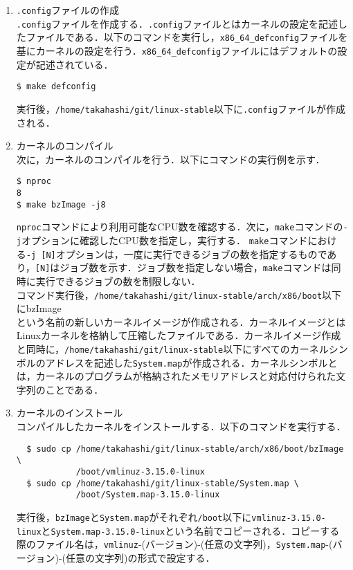 \documentclass[12pt]{jsarticle}
\begin{document}
\begin{enumerate}
\item \verb|.config|ファイルの作成 \\
\verb|.config|ファイルを作成する．\verb|.config|ファイルとはカーネルの設定を記述したファイルである．以下のコマンドを実行し，\verb|x86_64_defconfig|ファイルを基にカーネルの設定を行う．\verb|x86_64_defconfig|ファイルにはデフォルトの設定が記述されている．

\begin{verbatim}
$ make defconfig
\end{verbatim}
実行後，\verb|/home/takahashi/git/linux-stable|以下に\verb|.config|ファイルが作成される．

\item カーネルのコンパイル \\
次に，カーネルのコンパイルを行う．以下にコマンドの実行例を示す．

\newpage
\begin{verbatim}
$ nproc
8
$ make bzImage -j8
\end{verbatim}
\verb|nproc|コマンドにより利用可能なCPU数を確認する．次に，\verb|make|コマンドの\verb|-j|オプションに確認したCPU数を指定し，実行する．
\verb|make|コマンドにおける\verb|-j [N]|オプションは，一度に実行できるジョブの数を指定するものであり，\verb|[N]|はジョブ数を示す．ジョブ数を指定しない場合，\verb|make|コマンドは同時に実行できるジョブの数を制限しない．\\
コマンド実行後，\verb|/home/takahashi/git/linux-stable/arch/x86/boot|以下にbzImage\\
という名前の新しいカーネルイメージが作成される．カーネルイメージとはLinuxカーネルを格納して圧縮したファイルである．カーネルイメージ作成と同時に，\verb|/home/takahashi/git/linux-stable|以下にすべてのカーネルシンボルのアドレスを記述した\verb|System.map|が作成される．カーネルシンボルとは，カーネルのプログラムが格納されたメモリアドレスと対応付けられた文字列のことである．

\item カーネルのインストール \\
  コンパイルしたカーネルをインストールする．以下のコマンドを実行する．
\begin{verbatim}
  $ sudo cp /home/takahashi/git/linux-stable/arch/x86/boot/bzImage \
            /boot/vmlinuz-3.15.0-linux
  $ sudo cp /home/takahashi/git/linux-stable/System.map \
            /boot/System.map-3.15.0-linux
\end{verbatim}
実行後，\verb|bzImage|と\verb|System.map|がそれぞれ\verb|/boot|以下に\verb|vmlinuz-3.15.0-linux|と\verb|System.map-3.15.0-linux|という名前でコピーされる．コピーする際のファイル名は，\verb|vmlinuz|-(バージョン)-(任意の文字列)，\verb|System.map|-(バージョン)-(任意の文字列)の形式で設定する．


\end{enumerate}
\end{document}
